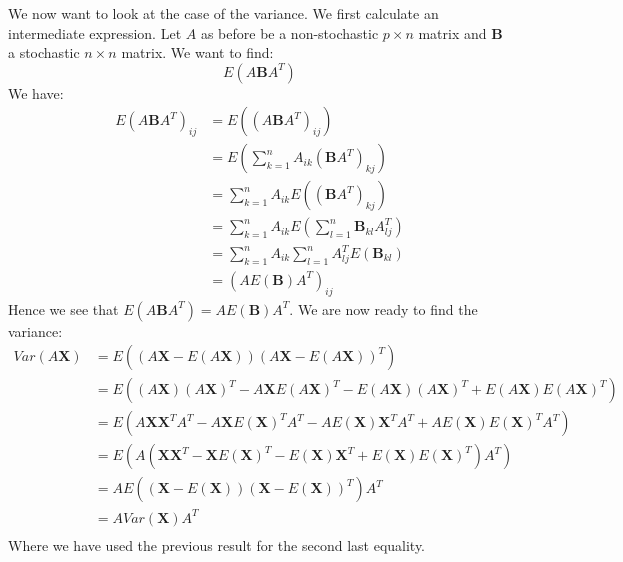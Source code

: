 \documentclass{article}
\begin{document}
We now want to look at the case of the variance. We first calculate an
intermediate expression. Let $A$ as before be a non-stochastic $p \times n$
matrix and $\mathbf{B}$ a stochastic $n \times n$ matrix. We want to find:
$$E(A \mathbf{B} A^T)$$
We have:
\begin{align*}
    E(A \mathbf{B} A^T)_{i j} & = E((A \mathbf{B} A^T)_{i j})                                         \\
                              & = E(\sum_{k = 1}^n A_{i k} (\mathbf{B} A^T)_{k j})                    \\
                              & = \sum_{k = 1}^n A_{i k} E((\mathbf{B} A^T)_{k j})                    \\
                              & = \sum_{k = 1}^n A_{i k} E(\sum_{l=1}^{n} \mathbf{B}_{k l} A^T_{l j}) \\
                              & = \sum_{k = 1}^n A_{i k} \sum_{l=1}^{n} A^T_{l j} E(\mathbf{B}_{k l}) \\
                              & = (A E(\mathbf{B}) A^T)_{i j}
\end{align*}
Hence we see that $E(A \mathbf{B} A^T) = A E(\mathbf{B}) A^T$.  We are now ready
to find the variance:
\begin{align*}
    Var(A \mathbf{X}) & = E((A \mathbf{X} - E(A \mathbf{X})) (A \mathbf{X} - E(A \mathbf{X}))^T)                                                                       \\
                      & = E((A \mathbf{X})(A \mathbf{X})^T  - A \mathbf{X} E(A \mathbf{X})^T - E(A \mathbf{X}) (A \mathbf{X})^T + E(A \mathbf{X}) E(A \mathbf{X})^T)   \\
                      & = E(A \mathbf{X}\mathbf{X}^T A^T  - A \mathbf{X} E(\mathbf{X})^T A^T - A E(\mathbf{X}) \mathbf{X}^T A^T + A E(\mathbf{X}) E(\mathbf{X})^T A^T) \\
                      & = E(A (\mathbf{X}\mathbf{X}^T  - \mathbf{X} E(\mathbf{X})^T - E(\mathbf{X}) \mathbf{X}^T + E(\mathbf{X}) E(\mathbf{X})^T ) A^T)                \\
                      & = A E((\mathbf{X} - E(\mathbf{X})) (\mathbf{X} - E(\mathbf{X}))^T) A^T                                                                         \\
                      & = A Var(\mathbf{X}) A^T                                                                                                                        \\
\end{align*}
Where we have used the previous result for the second last equality.


\end{document}
